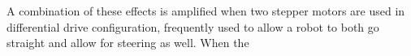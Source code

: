 A combination of these effects is amplified when two stepper motors are used in differential drive configuration, frequently used to allow a robot to both go straight and allow for steering as well.
When the 






